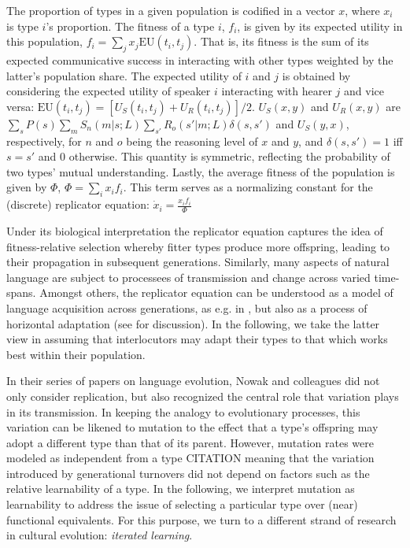 \documentclass[a4paper]{article}
\newcommand{\hl}[1]{\textcolor[rgb]{.8,.33,.0}{#1}}%
\begin{document}
The proportion of types in a given population is codified in a vector $x$, where $x_i$ is type $i$'s proportion. The fitness of a type $i$, $f_i$, is given by its expected utility in this population, $f_i = \sum_j x_j \text{EU}(t_i,t_j)$. That is, its fitness is the sum of its expected communicative success in interacting with other types weighted by the latter's population share. The expected utility of $i$ and $j$ is obtained by considering the expected utility of speaker $i$ interacting with hearer $j$ and vice versa: $\text{EU}(t_i,t_j) = [U_S(t_i,t_j) + U_R(t_i,t_j)]/2$. $U_S(x,y)$ and $U_R(x,y)$ are $\sum_s P(s)\sum_m S_n(m|s;L) \sum_{s'} R_o(s'|m;L) \delta(s,s')$ and $U_S(y,x)$, respectively, for $n$ and $o$ being the reasoning level of $x$ and $y$, and $\delta(s,s') = 1$ iff $s = s'$ and $0$ otherwise. This quantity is symmetric, reflecting the probability of two types' mutual understanding. Lastly, the average fitness of the population is given by $\Phi$, $\Phi = \sum_i x_i f_i$. This term serves as a normalizing constant for the (discrete) replicator equation: $\dot{x}_i = \frac{x_i f_i}{\Phi}$ 

Under its biological interpretation the replicator equation captures the idea of fitness-relative selection whereby fitter types produce more offspring, leading to their propagation in subsequent generations. Similarly, many aspects of natural language are subject to processees of transmission and change across varied time-spans. Amongst others, the replicator equation can be understood as a model of language acquisition across generations, as e.g. in \citealt{nowak+etal:2002}, but also as a process of horizontal adaptation (see \citealt[\S3.3]{benz+etal:2005b} for discussion). In the following, we take the latter view in assuming that interlocutors may adapt their types to that which works best within their population. 

In their series of papers on language evolution, Nowak and colleagues did not only consider replication, but also recognized the central role that variation plays in its transmission. In keeping the analogy to evolutionary processes, this variation can be likened to mutation to the effect that a type's offspring may adopt a different type than that of its parent. However, mutation rates were modeled as independent from a type \hl{CITATION} meaning that the variation introduced by generational turnovers did not depend on factors such as the relative learnability of a type. In the following, we interpret mutation as learnability to address the issue of selecting a particular type over (near) functional equivalents. For this purpose, we turn to a different strand of research in cultural evolution: {\em iterated learning}. 
\end{document}
